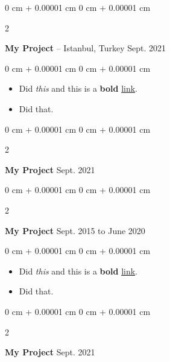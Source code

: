 \documentclass[10pt, letterpaper]{article}
\newenvironment{highlights}{
    \begin{itemize}[
        topsep=0.10 cm,
        parsep=0.10 cm,
        partopsep=0pt,
        itemsep=0pt,
        leftmargin=0 cm + 10pt
    ]
}{
    \end{itemize}
        
    \vspace{-0.10cm}
} %
\newenvironment{onecolentry}{
    \begin{adjustwidth}{
        0 cm + 0.00001 cm
    }{
        0 cm + 0.00001 cm
    }
}{
    \end{adjustwidth}
} %
\newenvironment{twocolentry}[2][]{
    \onecolentry
    \def\secondColumn{#2}
    \setcolumnwidth{\fill, 4.1 cm}
    \begin{paracol}{2}
}{
    \switchcolumn \raggedleft \secondColumn
    \end{paracol}
    \endonecolentry
} %
\begin{document}
        \vspace{0.15 cm}

        \begin{twocolentry}{
            Sept. 2021
        }
            \textbf{My Project} -- Istanbul, Turkey\end{twocolentry}

        \vspace{0.10 cm}
        \begin{onecolentry}
            \begin{highlights}
                \item Did \textit{this} and this is a \textbf{bold} \href{https://example.com}{link}.
                \item Did that.
            \end{highlights}
        \end{onecolentry}


        \vspace{0.15 cm}

        \begin{twocolentry}{
            Sept. 2021
        }
            \textbf{My Project}\end{twocolentry}

        \vspace{0.10 cm}


        \vspace{0.15 cm}

        \begin{twocolentry}{
            Sept. 2015 to June 2020
        }
            \textbf{My Project}\end{twocolentry}

        \vspace{0.10 cm}
        \begin{onecolentry}
            \begin{highlights}
                \item Did \textit{this} and this is a \textbf{bold} \href{https://example.com}{link}.
                \item Did that.
            \end{highlights}
        \end{onecolentry}


        \vspace{0.15 cm}

        \begin{twocolentry}{
            Sept. 2021
        }
            \textbf{My Project}\end{twocolentry}
\end{document}
